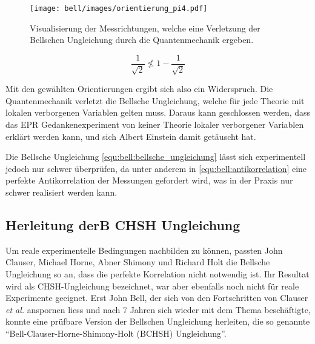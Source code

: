 \begin{refsection}
\begin{figure}
    \centering
    \texttt{[image: bell/images/orientierung\_pi4.pdf]}
    \caption{Visualisierung der Messrichtungen, welche eine Verletzung der
    Bellschen Ungleichung durch die Quantenmechanik ergeben.}
    \label{fig:bell:orientierung_pi4}
\end{figure}

\[
    \frac{1}{\sqrt{2}} \nleqslant 1 - \frac{1}{\sqrt{2}}
\]

Mit den gew\"ahlten Orientierungen ergibt sich also ein Widerspruch. 
Die Quantenmechanik verletzt die Bellsche Ungleichung, welche f\"ur jede Theorie
mit lokalen verborgenen Variablen gelten muss.
Daraus kann geschlossen werden, dass das EPR Gedankenexperiment von keiner
Theorie lokaler verborgener Variablen erkl\"art werden kann, und sich Albert
Einstein damit get\"auscht hat.

Die Bellsche Ungleichung \eqref{equ:bell:bellsche_ungleichung} l\"asst sich
experimentell jedoch nur schwer \"uberpr\"ufen, da unter anderem in
\eqref{equ:bell:antikorrelation} eine perfekte Antikorrelation der Messungen
gefordert wird, was in der Praxis nur schwer realisiert werden kann.

\subsection{Herleitung derB CHSH Ungleichung}
Um reale experimentelle Bedingungen nachbilden zu k\"onnen, passten
John Clauser, Michael Horne, Abner Shimony und Richard Holt 
\cite{Bell:Clauser1969} die Bellsche Ungleichung so an, dass die perfekte
Korrelation nicht notwendig ist.
Ihr Resultat wird als CHSH-Ungleichung bezeichnet, war aber ebenfalls noch nicht
f\"ur reale Experimente geeignet.
Erst John Bell, der sich von den Fortschritten von Clauser \textit{et al.}
anspornen liess und nach 7 Jahren sich wieder mit dem Thema besch\"aftigte,
konnte eine pr\"ufbare Version der Bellschen Ungleichung herleiten, die so
genannte \enquote{Bell-Clauser-Horne-Shimony-Holt (BCHSH) Ungleichung}. 


\end{refsection}
